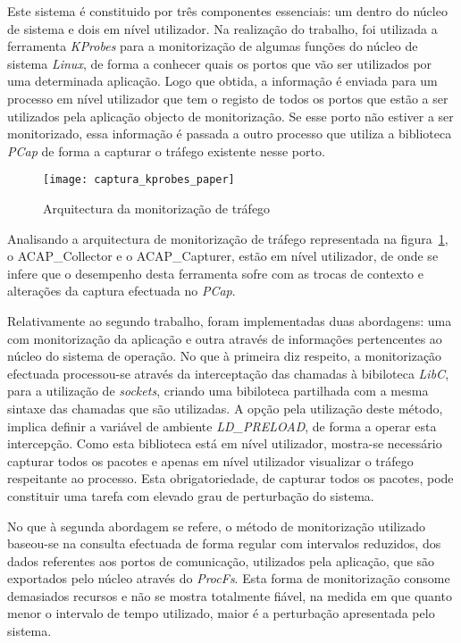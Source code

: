 Este sistema é constituido por três componentes essenciais: um dentro do núcleo de sistema e dois em nível utilizador.
Na realização do trabalho, foi utilizada a ferramenta \textit{KProbes} para a monitorização de algumas funções do núcleo de sistema \textit{Linux}, de forma a conhecer quais os portos que vão ser utilizados por uma determinada aplicação.
Logo que obtida, a informação é enviada para um processo em nível utilizador que tem o registo de todos os portos que estão a ser utilizados pela aplicação objecto de monitorização.
Se esse porto não estiver a ser monitorizado, essa informação é passada a outro processo que utiliza a biblioteca \textit{PCap} de forma a capturar o tráfego existente nesse porto.


\begin{figure}[h!]
       \centering
       \texttt{[image: captura\_kprobes\_paper]}
       \caption{Arquitectura da monitorização de tráfego \cite{1688981}}
	\label{fig:paper_capture_kprobes}
\end{figure}


Analisando a arquitectura de monitorização de tráfego representada na figura~\ref{fig:paper_capture_kprobes}, o ACAP\_Collector e o ACAP\_Capturer, estão em nível utilizador, de onde se infere que o desempenho desta ferramenta sofre com as trocas de contexto e alterações da captura efectuada no \textit{PCap}.

Relativamente ao segundo trabalho, foram implementadas duas abordagens: uma com monitorização da aplicação e outra através de informações pertencentes ao núcleo do sistema de operação.
No que à primeira diz respeito, a monitorização efectuada processou-se através da interceptação das chamadas à bibiloteca \textit{LibC}, para a utilização de \textit{sockets}, criando uma bibiloteca partilhada com a mesma sintaxe das chamadas que são utilizadas.
A opção pela utilização deste método, implica definir a variável de ambiente \textit{LD\_PRELOAD}, de forma a operar esta intercepção.
Como esta biblioteca está em nível utilizador, mostra-se necessário capturar todos os pacotes e apenas em nível utilizador visualizar o tráfego respeitante ao processo.
Esta obrigatoriedade, de capturar todos os pacotes, pode constituir uma tarefa com elevado grau de perturbação do sistema.

No que à segunda abordagem se refere, o método de monitorização utilizado baseou-se na consulta efectuada de forma regular com intervalos reduzidos, dos dados referentes aos portos de comunicação, utilizados pela aplicação, que são exportados pelo núcleo através do \textit{ProcFs}.
Esta forma de monitorização consome demasiados recursos e não se mostra totalmente fiável, na medida em que quanto menor o intervalo de tempo utilizado, maior é a perturbação apresentada pelo sistema.

